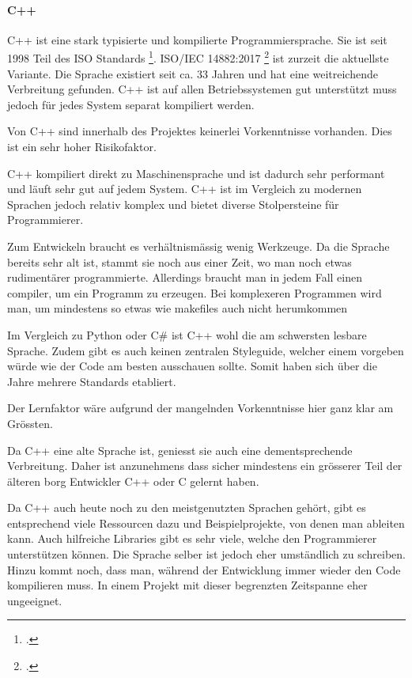 \paragraph{C++}
\label{sec:orga42458f}

C++ ist eine stark typisierte und kompilierte Programmiersprache. Sie ist seit
1998 Teil des ISO Standards \footcite{cpp98}. ISO/IEC 14882:2017 \footcite{cpp17}
ist zurzeit die aktuellste Variante. Die Sprache existiert seit ca. 33 Jahren
und hat eine weitreichende Verbreitung gefunden. C++ ist auf allen
Betriebssystemen gut unterstützt muss jedoch für jedes System separat
kompiliert werden.

Von C++ sind innerhalb des Projektes keinerlei Vorkenntnisse vorhanden. Dies
ist ein sehr hoher Risikofaktor.

C++ kompiliert direkt zu Maschinensprache und ist dadurch sehr performant und
läuft sehr gut auf jedem System. C++ ist im Vergleich zu modernen Sprachen
jedoch relativ komplex und bietet diverse Stolpersteine für Programmierer.

Zum Entwickeln braucht es verhältnismässig wenig Werkzeuge. Da die Sprache
bereits sehr alt ist, stammt sie noch aus einer Zeit, wo man noch etwas
rudimentärer programmierte. Allerdings braucht man in jedem Fall einen
\gls{compiler}, um ein Programm zu erzeugen. Bei komplexeren Programmen wird man,
um mindestens so etwas wie \glspl{makefile} auch nicht herumkommen

Im Vergleich zu Python oder C\# ist C++ wohl die am schwersten lesbare Sprache.
Zudem gibt es auch keinen zentralen Styleguide, welcher einem vorgeben würde wie
der Code am besten ausschauen sollte. Somit haben sich über die Jahre mehrere
Standards etabliert.

Der Lernfaktor wäre aufgrund der mangelnden Vorkenntnisse hier ganz klar am
Grössten.

Da C++ eine alte Sprache ist, geniesst sie auch eine dementsprechende
Verbreitung. Daher ist anzunehmens dass sicher mindestens ein grösserer Teil der
älteren \gls{borg} Entwickler C++ oder C gelernt haben.

Da C++ auch heute noch zu den meistgenutzten Sprachen gehört, gibt es
entsprechend viele Ressourcen dazu und Beispielprojekte, von denen man ableiten
kann. Auch hilfreiche Libraries gibt es sehr viele, welche den Programmierer
unterstützen können. Die Sprache selber ist jedoch eher umständlich zu
schreiben. Hinzu kommt noch, dass man, während der Entwicklung immer wieder den
Code kompilieren muss. In einem Projekt mit dieser begrenzten Zeitspanne eher
ungeeignet.

